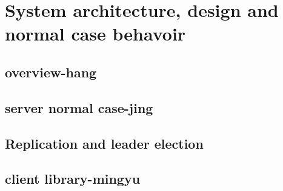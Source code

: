 \section{System architecture, design and normal case behavoir}
\subsection{overview-hang}

\subsection{server normal case-jing}

\subsection{Replication and leader election}


\subsection{client library-mingyu}
